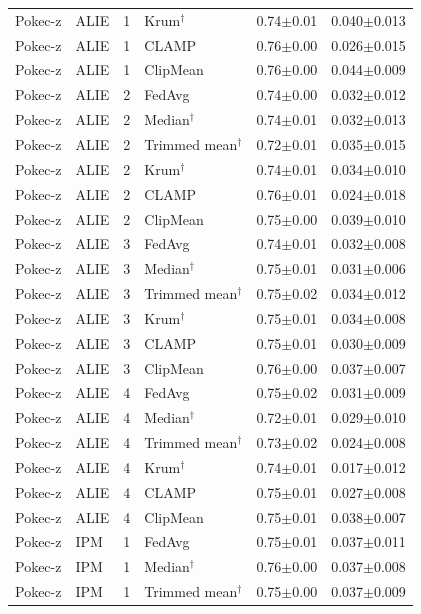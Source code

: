\begin{longtable}{llclcc}
Pokec-z & ALIE & 1 & Krum$^\dagger$ & 0.74$\pm$0.01 & 0.040$\pm$0.013 \\
Pokec-z & ALIE & 1 & CLAMP & 0.76$\pm$0.00 & 0.026$\pm$0.015 \\
Pokec-z & ALIE & 1 & ClipMean & 0.76$\pm$0.00 & 0.044$\pm$0.009 \\
Pokec-z & ALIE & 2 & FedAvg & 0.74$\pm$0.00 & 0.032$\pm$0.012 \\
Pokec-z & ALIE & 2 & Median$^\dagger$ & 0.74$\pm$0.01 & 0.032$\pm$0.013 \\
Pokec-z & ALIE & 2 & Trimmed mean$^\dagger$ & 0.72$\pm$0.01 & 0.035$\pm$0.015 \\
Pokec-z & ALIE & 2 & Krum$^\dagger$ & 0.74$\pm$0.01 & 0.034$\pm$0.010 \\
Pokec-z & ALIE & 2 & CLAMP & 0.76$\pm$0.01 & 0.024$\pm$0.018 \\
Pokec-z & ALIE & 2 & ClipMean & 0.75$\pm$0.00 & 0.039$\pm$0.010 \\
Pokec-z & ALIE & 3 & FedAvg & 0.74$\pm$0.01 & 0.032$\pm$0.008 \\
Pokec-z & ALIE & 3 & Median$^\dagger$ & 0.75$\pm$0.01 & 0.031$\pm$0.006 \\
Pokec-z & ALIE & 3 & Trimmed mean$^\dagger$ & 0.75$\pm$0.02 & 0.034$\pm$0.012 \\
Pokec-z & ALIE & 3 & Krum$^\dagger$ & 0.75$\pm$0.01 & 0.034$\pm$0.008 \\
Pokec-z & ALIE & 3 & CLAMP & 0.75$\pm$0.01 & 0.030$\pm$0.009 \\
Pokec-z & ALIE & 3 & ClipMean & 0.76$\pm$0.00 & 0.037$\pm$0.007 \\
Pokec-z & ALIE & 4 & FedAvg & 0.75$\pm$0.02 & 0.031$\pm$0.009 \\
Pokec-z & ALIE & 4 & Median$^\dagger$ & 0.72$\pm$0.01 & 0.029$\pm$0.010 \\
Pokec-z & ALIE & 4 & Trimmed mean$^\dagger$ & 0.73$\pm$0.02 & 0.024$\pm$0.008 \\
Pokec-z & ALIE & 4 & Krum$^\dagger$ & 0.74$\pm$0.01 & 0.017$\pm$0.012 \\
Pokec-z & ALIE & 4 & CLAMP & 0.75$\pm$0.01 & 0.027$\pm$0.008 \\
Pokec-z & ALIE & 4 & ClipMean & 0.75$\pm$0.01 & 0.038$\pm$0.007 \\
Pokec-z & IPM & 1 & FedAvg & 0.75$\pm$0.01 & 0.037$\pm$0.011 \\
Pokec-z & IPM & 1 & Median$^\dagger$ & 0.76$\pm$0.00 & 0.037$\pm$0.008 \\
Pokec-z & IPM & 1 & Trimmed mean$^\dagger$ & 0.75$\pm$0.00 & 0.037$\pm$0.009 \\

\end{longtable}

